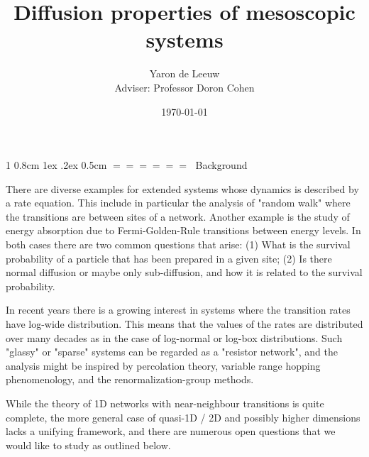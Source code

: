 \documentclass[onecolumn,fleqn,notitlepage,secnumarabic]{revtex4}
\makeatletter
\def\section{%
  \@startsection
    {section}%
    {1}%
    {\z@}%
    {0.8cm \@plus1ex \@minus .2ex}%
    {0.5cm}%
    {\Large\bf $=\!=\!=\!=\!=\!=\;$}%
}%
\makeatother
\begin{document}
\title{Diffusion properties of mesoscopic systems}

\author{Yaron de Leeuw \\ Adviser: Professor Doron Cohen}
\date{\today}
\maketitle


\section{Background}

There are diverse examples for extended systems whose dynamics is described by a rate equation. This include in particular the analysis of "random walk" where the transitions are between sites of a network. Another example is the study of energy absorption due to Fermi-Golden-Rule transitions between energy levels. In both cases there are two common questions that arise: (1) What is the survival probability of a particle  that has been prepared in a given site; (2) Is there normal diffusion or maybe only sub-diffusion, and how it is related to the survival probability.

In recent years there is a growing interest in systems where the transition rates have log-wide distribution. This means that the values of the rates
are distributed over many decades as in the case of log-normal or log-box distributions. Such "glassy" or "sparse" systems can be regarded as a "resistor network", and the analysis might be inspired by percolation theory, variable range hopping phenomenology, and the renormalization-group methods.

While the theory of 1D networks with near-neighbour transitions is quite complete, the more general case of quasi-1D / 2D and possibly higher dimensions lacks a unifying framework, and there are numerous open questions that we would like to study as outlined below.
\end{document}
